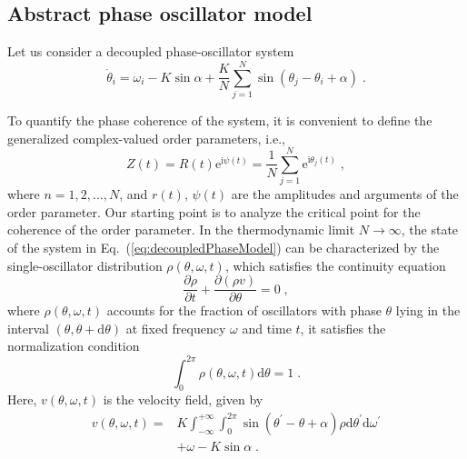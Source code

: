 \documentclass{article}
\begin{document}
\subsection{Abstract phase oscillator model}
Let us consider a decoupled phase-oscillator system 
\begin{equation}
    \dot{\theta}_i=\omega _i-K\sin \alpha +\frac{K}{N}\sum_{j=1}^N{\sin \left( \theta _j-\theta _i+\alpha \right)}\;.
    \label{eq:decoupledPhaseModel}
\end{equation}

To quantify the phase coherence of the system, it is convenient to define the generalized complex-valued order parameters, i.e.,
\begin{equation}
    \label{eq:orderParameter}
    Z\left( t \right) =R\left( t \right) \text{e}^{\text{i}\psi\left( t \right)}=\frac{1}{N}\sum_{j=1}^N{\text{e}^{\text{i}\theta _{j}\left( t \right)}}\;,
\end{equation}
where $n=1,2,\dots, N$, and $r\left( t \right)$, $\psi \left( t \right)$ are the amplitudes and arguments of the order parameter.
Our starting point is to analyze the critical point for the coherence of the order parameter.
In the thermodynamic limit $N\to \infty$, the state of the system in Eq.~(\ref{eq:decoupledPhaseModel}) can be characterized by the single-oscillator distribution $\rho\left( \theta ,\omega, t \right)$, which satisfies the continuity equation
\begin{equation}
    \frac{\partial \rho}{\partial t}+\frac{\partial \left( \rho v \right)}{\partial \theta}=0\;,
    \label{eq:continuityEquation}
\end{equation}
where $\rho \left( \theta ,\omega ,t \right)$ accounts for the fraction of oscillators with phase $\theta$ lying in the interval $\left( \theta ,\theta +\mathrm{d}\theta \right)$ at fixed frequency $\omega$ and time $t$, it satisfies the normalization condition
\begin{equation}
    \label{eq:normalization}
    \int_{0}^{2\pi}{\rho \left( \theta ,\omega ,t \right) \text{d}\theta} =1\;.
\end{equation}
Here, $v\left( \theta ,\omega ,t \right)$ is the velocity field, given by
\begin{equation}
    \begin{aligned}
        v\left( \theta ,\omega ,t \right) =&K\int_{-\infty}^{+\infty}{\int_0^{2\pi}{\sin \left( \theta ^{\prime}-\theta +\alpha \right) \rho \mathrm{d}\theta ^{\prime}\mathrm{d}\omega ^{\prime}}}\\
        &+\omega -K\sin \alpha \;.
    \end{aligned} 
\end{equation}
\end{document}
